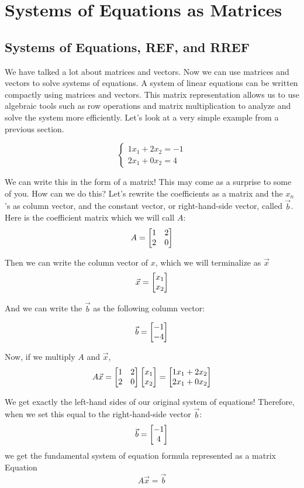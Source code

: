 \chapter{Systems of Equations as Matrices}\label{chap:syseqma}

\section{Systems of Equations, REF, and RREF}

We have talked a lot about matrices and vectors. Now we can use matrices and vectors to solve systems of equations. A system of linear equations can be written compactly using matrices and vectors. This matrix representation allows us to use algebraic tools such as row operations and matrix multiplication to analyze and solve the system more efficiently. Let's look at a very simple example from a previous section.

\[\begin{cases}
1x_1 + 2x_2 = -1 \\
2x_1 + 0x_2 = 4
\end{cases}\]

We can write this in the form of a matrix! This may come as a surprise to some of you. How can we do this? Let's rewrite the coefficients as a matrix and the $x_n$'s as column vector, and the constant vector, or right-hand-side vector, called $\vec{b}$. 
Here is the coefficient matrix which we will call $A$:
\[A = \begin{bmatrix} 1 & 2 \\ 2 & 0 \end{bmatrix}\]

Then we can write the column vector of $x$, which we will terminalize as $\vec{x}$
\[\vec{x} = \begin{bmatrix} x_1 \\ x_2 \end{bmatrix}\] 

And we can write the $\vec{b}$ as the following column vector:

\[
\vec{b} = \begin{bmatrix} -1 \\ -4 \end{bmatrix}
\]

Now, if we multiply $A$ and $\vec{x}$,
$$A\vec{x} = \begin{bmatrix} 1 & 2 \\ 2 & 0 \end{bmatrix}\begin{bmatrix} x_1 \\ x_2 \end{bmatrix} = \begin{bmatrix} 1x_1 + 2x_2 \\ 2x_1 + 0x_2 \end{bmatrix}$$

We get exactly the left-hand sides of our original system of equations!
Therefore, when we set this equal to the right-hand-side vector $\vec{b}$:
$$\vec{b}=\begin{bmatrix} -1 \\ 4 \end{bmatrix}$$
we get the fundamental system of equation formula represented as a matrix Equation
\begin{equation}
       A\vec{x} = \vec{b}
       \label{eq:matrixform}
\end{equation}

